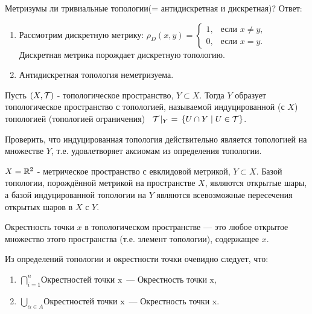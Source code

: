 \begin{exercise}
    Метризумы ли тривиальные топологии(= антидискретная и дискретная)?
    Ответ:
    \begin{enumerate}
        \item Рассмотрим дискретную метрику: $\rho_{D}(x, y) =
        \begin{cases}
            1, &\text{если $x \neq y$,} \\
            0, &\text{если $x = y$.}
        \end{cases} $
        Дискретная метрика порождает дискретную топологию.
        \item Антидискретная топология неметризуема.
    \end{enumerate}
\end{exercise}

\begin{definition}
    Пусть $(X, \mathcal{T})$ - топологическое пространство, $Y \subset X$. Тогда $Y$ образует топологическое пространство с топологией, называемой индуцированной (с $X$) топологией (топологией ограничения) \ $\mathcal{T}\!\mid_{Y} \ = \, \left\{U \cap Y \mid U \in \mathcal{T}\right\}$.
\end{definition}
\begin{exercise}
    Проверить, что индуцированная топология действительно является топологией на множестве $Y$, т.е. удовлетворяет аксиомам из определения топологии.
\end{exercise}

\begin{example}
    $X = \mathbb{R}^2$ - метрическое пространство с евклидовой метрикой, $Y \subset X$. Базой топологии, порождённой метрикой на пространстве $X$, являются открытые шары, а базой индуцированной топологии на $Y$ являются всевозможные пересечения открытых шаров в $X$ с $Y$.
\end{example}

\begin{definition}
    Окрестность точки $x$ в топологическом пространстве --- это любое открытое множество этого пространства (т.е. элемент топологии), содержащее $x$.
\end{definition}

\begin{nota_bene} Из определений топологии и окрестности точки очевидно следует, что:
    \begin{enumerate}
        \item $\bigcap_{i = 1}^{n} \text{Окрестностей точки x}$ --- $\text{Окрестность точки x}$,
        \item $\bigcup_{\alpha \in A} \text{Окрестностей точки x}$ --- $\text{Окрестность точки x}$.
    \end{enumerate}
\end{nota_bene}

